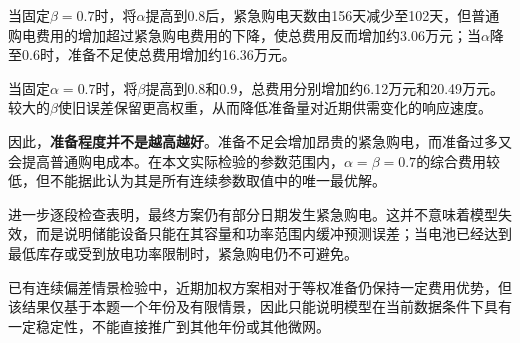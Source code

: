 当固定$\beta=0.7$时，将$\alpha$提高到0.8后，紧急购电天数由156天减少至102天，但普通购电费用的增加超过紧急购电费用的下降，使总费用反而增加约3.06万元；当$\alpha$降至0.6时，准备不足使总费用增加约16.36万元。

当固定$\alpha=0.7$时，将$\beta$提高到0.8和0.9，总费用分别增加约6.12万元和20.49万元。较大的$\beta$使旧误差保留更高权重，从而降低准备量对近期供需变化的响应速度。

因此，\textbf{准备程度并不是越高越好}。准备不足会增加昂贵的紧急购电，而准备过多又会提高普通购电成本。在本文实际检验的参数范围内，$\alpha=\beta=0.7$的综合费用较低，但不能据此认为其是所有连续参数取值中的唯一最优解。

进一步逐段检查表明，最终方案仍有部分日期发生紧急购电。这并不意味着模型失效，而是说明储能设备只能在其容量和功率范围内缓冲预测误差；当电池已经达到最低库存或受到放电功率限制时，紧急购电仍不可避免。

已有连续偏差情景检验中，近期加权方案相对于等权准备仍保持一定费用优势，但该结果仅基于本题一个年份及有限情景，因此只能说明模型在当前数据条件下具有一定稳定性，不能直接推广到其他年份或其他微网。
